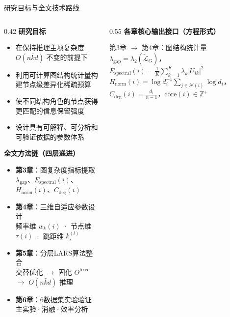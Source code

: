 \documentclass[aspectratio=169,9pt,xcolor=dvipsnames]{beamer}
\newcommand{\blue}[1]{\textcolor{mynavy}{#1}}
\newcommand{\kbar}{\ensuremath{\bar{k}}}
\begin{document}
\begin{frame}{研究目标与全文技术路线}
  \begin{columns}[T]
    \begin{column}{0.42\textwidth}
      \textbf{\blue{研究目标}}
      \begin{itemize}
        \item 在保持推理主项复杂度 $O(n\kbar d)$ 不变的前提下
        \item 利用可计算图结构统计量构建节点级差异化稀疏预算
        \item 使不同结构角色的节点获得更匹配的信息保留强度
        \item 设计具有可解释、可分析和可验证依据的参数体系
      \end{itemize}

      \vspace{0.1cm}
      \textbf{\blue{全文方法链（四层递进）}}
      \begin{itemize}
        \item \textbf{第3章}：图复杂度指标提取\\
          $\lambda_{\mathrm{gap}}$、$E_{\mathrm{spectral}}(i)$、$H_{\mathrm{norm}}(i)$、$C_{\mathrm{deg}}(i)$
        \item \textbf{第4章}：三维自适应参数设计\\
          频率维 $w_k(i)$ · 节点维 $\tau(i)$ · 跳距维 $k_i^{(l)}$
        \item \textbf{第5章}：分层LARS算法整合\\
          交替优化 $\to$ 固化 $\Theta^{\mathrm{fixed}}$ $\to$ $O(n\kbar d)$ 推理
        \item \textbf{第6章}：6数据集实验验证\\
          主实验·消融·效率分析
      \end{itemize}
    \end{column}

    \begin{column}{0.55\textwidth}
      \textbf{\blue{各章核心输出接口（方程形式）}}

      \begin{block}{第3章 $\to$ 第4章：图结构统计量}
        \small
        $\lambda_{\mathrm{gap}}=\lambda_2(\tilde{\mathcal{L}}_G)$，\quad
        $E_{\mathrm{spectral}}(i)=\tfrac{1}{K}\sum_{k=1}^{K}\lambda_k|U_{ik}|^2$\\[2pt]
        $H_{\mathrm{norm}}(i)=\log d_i^{-1}\sum_{j\in\mathcal{N}(i)}\log d_i$，\quad
        $C_{\mathrm{deg}}(i)=\tfrac{d_i}{n-1}$，\quad $\mathrm{core}(i)\in\mathbb{Z}^+$
      \end{block}


\end{column}
\end{columns}
\end{frame}
\end{document}
